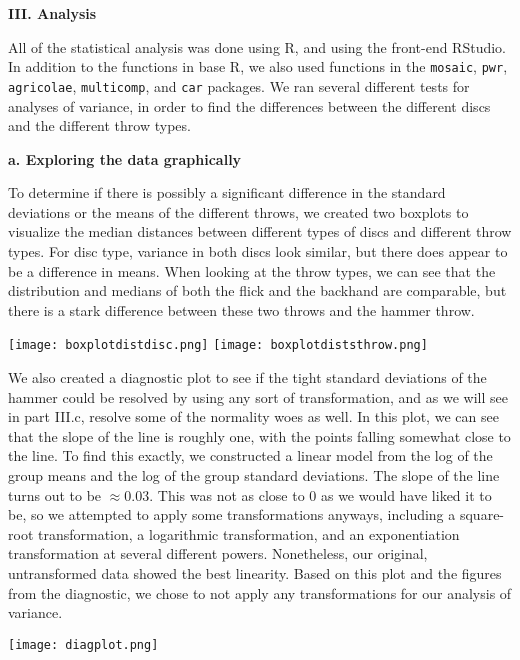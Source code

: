 \documentclass[letter,12pt]{article}
\begin{document}
	\begin{center}
		\textbf{III. Analysis}\par
	\end{center}
	\justify
	All of the statistical analysis was done using R, and using the front-end RStudio. In addition to the functions in base R, we also used functions in the \verb|mosaic|, \verb|pwr|, \verb|agricolae|, \verb|multicomp|, and \verb|car| packages. We ran several different tests for analyses of variance, in order to find the differences between the different discs and the different throw types.\par
	
	\begin{center}
		\textbf{a. Exploring the data graphically}\par
	\end{center}
	\justify
	To determine if there is possibly a significant difference in the standard deviations or the means of the different throws, we created two boxplots to visualize the median distances between different types of discs and different throw types. For disc type, variance in both discs look similar, but there does appear to be a difference in means. When looking at the throw types, we can see that the distribution and medians of both the flick and the backhand are comparable, but there is a stark difference between these two throws and the hammer throw.\par
  \begin{center}
    \texttt{[image: boxplotdistdisc.png]}
    \texttt{[image: boxplotdiststhrow.png]}
  \end{center}
  We also created a diagnostic plot to see if the tight standard deviations of the hammer could be resolved by using any sort of transformation, and as we will see in part III.c, resolve some of the normality woes as well. In this plot, we can see that the slope of the line is roughly one, with the points falling somewhat close to the line. To find this exactly, we constructed a linear model from the log of the group means and the log of the group standard deviations. The slope of the line turns out to be $\approx 0.03$. This was not as close to 0 as we would have liked it to be, so we attempted to apply some transformations anyways, including a square-root transformation, a logarithmic transformation, and an exponentiation transformation at several different powers. Nonetheless, our original, untransformed data showed the best linearity. Based on this plot and the figures from the diagnostic, we chose to not apply any transformations for our analysis of variance.\par
  \begin{center}
    \texttt{[image: diagplot.png]}
  \end{center}
	
\end{document}
